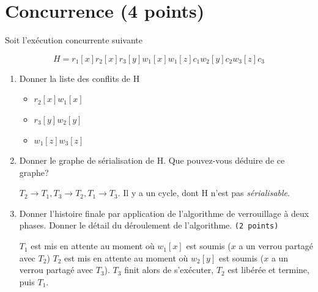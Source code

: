 \section{Concurrence (4 points)}

Soit l'exécution concurrente suivante

$$H = r_1[x] r_2[x] r_3[y] w_1[x] w_1[z] c_1 w_2[y] c_2 w_3[z] c_3$$

\begin{enumerate}

\item Donner la liste des conflits de H
\begin{solution}
    \begin{itemize}
        \item[sur x : ] $r_2[x] w_1[x]$
        \item[sur y : ] $r_3[y] w_2[y]$
        \item[sur z : ] $w_1[z] w_3[z]$
    \end{itemize}
\end{solution}

\item Donner le graphe de s\'erialisation de H. Que pouvez-vous déduire de ce
graphe? 
\begin{solution}
    $T_2 \rightarrow T_1, T_3 \rightarrow T_2, T_1 \rightarrow T_3$. Il y a un cycle, dont H n'est pas \textit{s\'erialisable}.
\end{solution}


\item Donner l'histoire finale par application de l'algorithme de verrouillage \`a deux phases. 
Donner le d\'etail du d\'eroulement de l'algorithme.
 \texttt{(2 points)}

\begin{solution}
$T_1$  est mis en attente au moment où $w_1[x]$ est soumis ($x$ a un  verrou partagé avec $T_2$)
$T_2$  est mis en attente au moment où $w_2[y]$ est soumis ($x$ a un  verrou partagé avec $T_3$). 
$T_3$ finit alors de s'exécuter, $T_2$ est libérée et termine, puis $T_1$.
\end{solution}


\end{enumerate}
